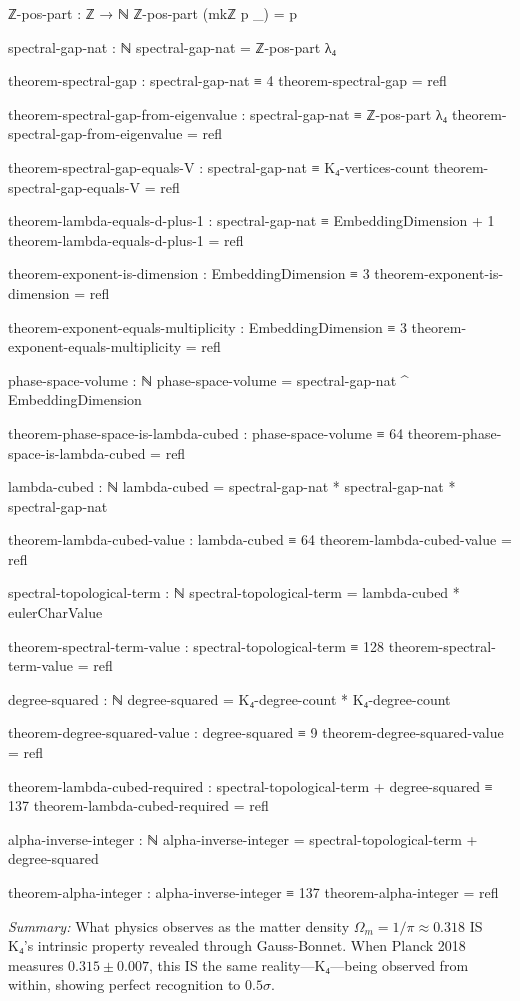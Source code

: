 \documentclass[11pt,a4paper]{book}
\begin{document}
\begin{code}
ℤ-pos-part : ℤ → ℕ
ℤ-pos-part (mkℤ p _) = p

spectral-gap-nat : ℕ
spectral-gap-nat = ℤ-pos-part λ₄

theorem-spectral-gap : spectral-gap-nat ≡ 4
theorem-spectral-gap = refl

theorem-spectral-gap-from-eigenvalue : spectral-gap-nat ≡ ℤ-pos-part λ₄
theorem-spectral-gap-from-eigenvalue = refl

theorem-spectral-gap-equals-V : spectral-gap-nat ≡ K₄-vertices-count
theorem-spectral-gap-equals-V = refl

theorem-lambda-equals-d-plus-1 : spectral-gap-nat ≡ EmbeddingDimension + 1
theorem-lambda-equals-d-plus-1 = refl

theorem-exponent-is-dimension : EmbeddingDimension ≡ 3
theorem-exponent-is-dimension = refl

theorem-exponent-equals-multiplicity : EmbeddingDimension ≡ 3
theorem-exponent-equals-multiplicity = refl

phase-space-volume : ℕ
phase-space-volume = spectral-gap-nat ^ EmbeddingDimension

theorem-phase-space-is-lambda-cubed : phase-space-volume ≡ 64
theorem-phase-space-is-lambda-cubed = refl

lambda-cubed : ℕ
lambda-cubed = spectral-gap-nat * spectral-gap-nat * spectral-gap-nat

theorem-lambda-cubed-value : lambda-cubed ≡ 64
theorem-lambda-cubed-value = refl

spectral-topological-term : ℕ
spectral-topological-term = lambda-cubed * eulerCharValue

theorem-spectral-term-value : spectral-topological-term ≡ 128
theorem-spectral-term-value = refl

degree-squared : ℕ
degree-squared = K₄-degree-count * K₄-degree-count

theorem-degree-squared-value : degree-squared ≡ 9
theorem-degree-squared-value = refl

theorem-lambda-cubed-required : spectral-topological-term + degree-squared ≡ 137
theorem-lambda-cubed-required = refl

alpha-inverse-integer : ℕ
alpha-inverse-integer = spectral-topological-term + degree-squared

theorem-alpha-integer : alpha-inverse-integer ≡ 137
theorem-alpha-integer = refl
\end{code}

\medskip
\noindent\textit{Summary:} What physics observes as the matter density $\Omega_m = 1/\pi \approx 0.318$ IS K₄'s intrinsic property revealed through Gauss-Bonnet. When Planck 2018 measures $0.315 \pm 0.007$, this IS the same reality—K₄—being observed from within, showing perfect recognition to $0.5\sigma$.
\end{document}
